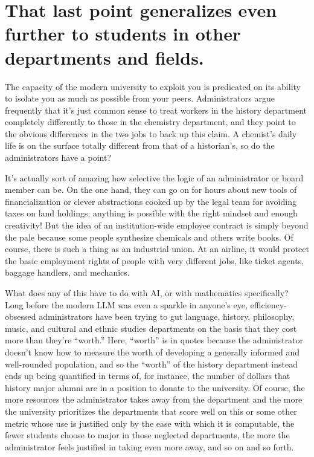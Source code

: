 \documentclass[11pt,reqno]{amsart}
\theoremstyle{plain}
\theoremstyle{definition}
\numberwithin{equation}{section}
\numberwithin{theorem}{section}
\begin{document}
\section{That last point generalizes even further to students in other departments and fields. 
}

The capacity of the modern university to exploit you is predicated on its ability to isolate you as much as possible from your peers. Administrators argue frequently that it’s just common sense to treat workers in the history department completely differently to those in the chemistry department, and they point to the obvious differences in the two jobs to back up this claim. A chemist’s daily life is on the surface totally different from that of a historian’s, so do the administrators have a point? 


It’s actually sort of amazing how selective the logic of an administrator or board member can be. On the one hand, they can go on for hours about new tools of financialization or clever abstractions cooked up by the legal team for avoiding taxes on land holdings; anything is possible with the right mindset and enough creativity! But the idea of an institution-wide employee contract is simply beyond the pale because some people synthesize chemicals and others write books. Of course, there is such a thing as an industrial union. At an airline, it would protect the basic employment rights of people with very different jobs, like ticket agents, baggage handlers, and mechanics. 


What does any of this have to do with AI, or with mathematics specifically? Long before the modern LLM was even a sparkle in anyone’s eye, efficiency-obsessed administrators have been trying to gut language, history, philosophy, music, and cultural and ethnic studies departments on the basis that they cost more than they’re ``worth.'' Here, ``worth'' is in quotes because the administrator doesn’t know how to measure the worth of developing a generally informed and well-rounded population, and so the ``worth'' of the history department instead ends up being quantified in terms of, for instance, the number of dollars that history major alumni are in a position to donate to the university. Of course, the more resources the administrator takes away from the department and the more the university prioritizes the departments that score well on this or some other metric whose use is justified only by the ease with which it is computable, the fewer students choose to major in those neglected departments, the more the administrator feels justified in taking even more away, and so on and so forth. 
\end{document}
